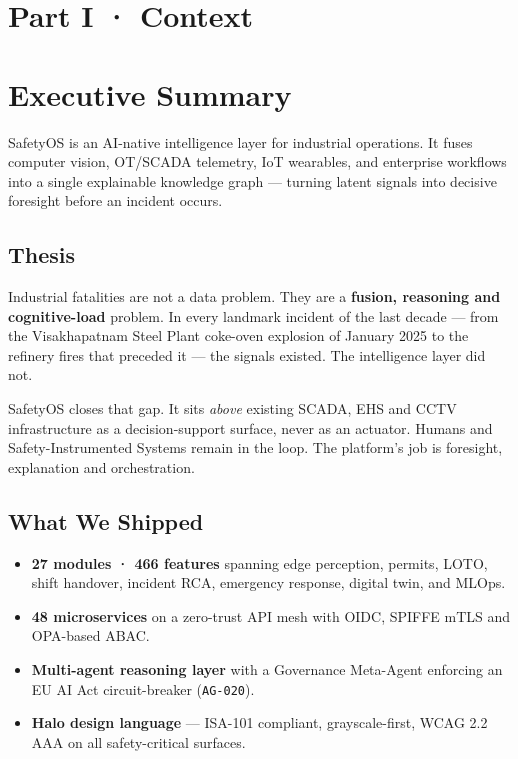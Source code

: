 \documentclass[11pt,a4paper]{article}
\begin{document}
\section*{Part I · Context}

\section{Executive Summary}
SafetyOS is an AI-native intelligence layer for industrial operations. It fuses computer vision, OT/SCADA telemetry, IoT wearables, and enterprise workflows into a single explainable knowledge graph — turning latent signals into decisive foresight before an incident occurs.

\subsection{Thesis}
Industrial fatalities are not a data problem. They are a \textbf{fusion, reasoning and cognitive-load} problem. In every landmark incident of the last decade — from the Visakhapatnam Steel Plant coke-oven explosion of January 2025 to the refinery fires that preceded it — the signals existed. The intelligence layer did not.

SafetyOS closes that gap. It sits \textit{above} existing SCADA, EHS and CCTV infrastructure as a decision-support surface, never as an actuator. Humans and Safety-Instrumented Systems remain in the loop. The platform's job is foresight, explanation and orchestration.

\subsection{What We Shipped}
\begin{itemize}
    \item \textbf{27 modules · 466 features} spanning edge perception, permits, LOTO, shift handover, incident RCA, emergency response, digital twin, and MLOps.
    \item \textbf{48 microservices} on a zero-trust API mesh with OIDC, SPIFFE mTLS and OPA-based ABAC.
    \item \textbf{Multi-agent reasoning layer} with a Governance Meta-Agent enforcing an EU AI Act circuit-breaker (\texttt{AG-020}).
    \item \textbf{Halo design language} — ISA-101 compliant, grayscale-first, WCAG 2.2 AAA on all safety-critical surfaces.
\end{itemize}
\end{document}

